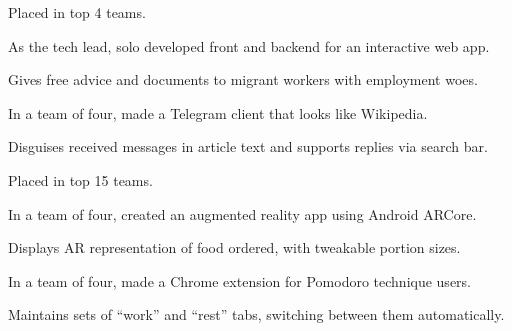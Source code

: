 \documentclass[]{deedy-resume-openfont}
\begin{document}
\begin{minipage}[t]{0.66\textwidth}
\begin{tightemize}
\item Placed in top 4 teams.
\item As the tech lead, solo developed front and backend for an interactive web app.
\item Gives free advice and documents to migrant workers with employment woes.
\end{tightemize}
\sectionsep

\begin{tightemize}
\item In a team of four, made a Telegram client that looks like Wikipedia.
\item  Disguises received messages in article text and supports replies via search bar.
\end{tightemize}
\sectionsep

\begin{tightemize}
\item Placed in top 15 teams.
\item In a team of four, created an augmented reality app using Android ARCore.
\item Displays AR representation of food ordered, with tweakable portion sizes.
\end{tightemize}
\sectionsep

\begin{tightemize}
\item In a team of four, made a Chrome extension for Pomodoro technique users.
\item Maintains sets of ``work'' and ``rest'' tabs, switching between them automatically.
\end{tightemize}
\sectionsep



\end{minipage}
\end{document}
